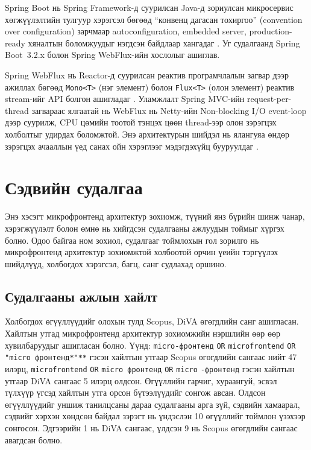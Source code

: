 Spring Boot нь Spring Framework-д суурилсан Java-д зориулсан микросервис хөгжүүлэлтийн тулгуур хэрэгсэл бөгөөд ``конвенц дагасан тохиргоо'' (convention over configuration) зарчмаар autoconfiguration, embedded server, production-ready хяналтын боломжуудыг нэгдсэн байдлаар хангадаг \cite{newman2019}. Уг судалгаанд Spring Boot~3.2.x болон Spring WebFlux-ийн хослолыг ашиглав.

Spring WebFlux нь Reactor-д суурилсан реактив програмчлалын загвар дээр ажиллах бөгөөд \texttt{Mono<T>} (нэг элемент) болон \texttt{Flux<T>} (олон элемент) реактив stream-ийг API болгон ашигладаг \cite{blinowski2022}. Уламжлалт Spring MVC-ийн request-per-thread загвараас ялгаатай нь WebFlux нь Netty-ийн Non-blocking I/O event-loop дээр суурилж, CPU цөмийн тоотой тэнцэх цөөн thread-ээр олон зэрэгцэх холболтыг удирдах боломжтой. Энэ архитектурын шийдэл нь ялангуяа өндөр зэрэгцэх ачааллын үед санах ойн хэрэглээг мэдэгдэхүйц бууруулдаг \cite{dragoni2017}.


\section{Сэдвийн судалгаа}
\label{sec:literature-review}

Энэ хэсэгт микрофронтенд архитектур зохиомж, түүний янз бүрийн шинж чанар, хэрэгжүүлэлт болон өмнө нь хийгдсэн судалгааны ажлуудын тоймыг хүргэх болно. Одоо байгаа ном зохиол, судалгааг тоймлохын гол зорилго нь микрофронтенд архитектур зохиомжтой холбоотой орчин үеийн тэргүүлэх шийдлүүд, холбогдох хэрэгсэл, багц, санг судлахад оршино.

\subsection{Судалгааны ажлын хайлт}
Холбогдох өгүүллүүдийг олохын тулд Scopus, DiVA өгөгдлийн санг ашигласан. Хайлтын утгад микрофронтенд архитектур зохиомжийн нэршлийн өөр өөр хувилбаруудыг ашигласан болно. Үүнд: \verb|micro-фронтенд| \verb|OR| \verb|microfrontend| \verb|OR| \verb|"micro фронтенд*"**| гэсэн хайлтын утгаар Scopus өгөгдлийн сангаас нийт 47 илэрц, \verb|microfrontend| \verb|OR| \verb|micro фронтенд| \verb|OR| \verb|micro| \verb|-фронтенд| гэсэн хайлтын утгаар DiVA сангаас 5 илэрц олдсон. Өгүүллийн гарчиг, хураангуй, эсвэл түлхүүр үгсэд хайлтын утга орсон бүтээлүүдийг сонгож авсан. Олдсон өгүүллүүдийг уншиж танилцсаны дараа судалгааны арга зүй, сэдвийн хамаарал, сэдвийг хэрхэн хөндсөн байдал зэрэгт нь үндэслэн 10 өгүүллийг тоймлон үзэхээр сонгосон. Эдгээрийн 1 нь DiVA сангаас, үлдсэн 9 нь Scopus өгөгдлийн сангаас авагдсан болно.

